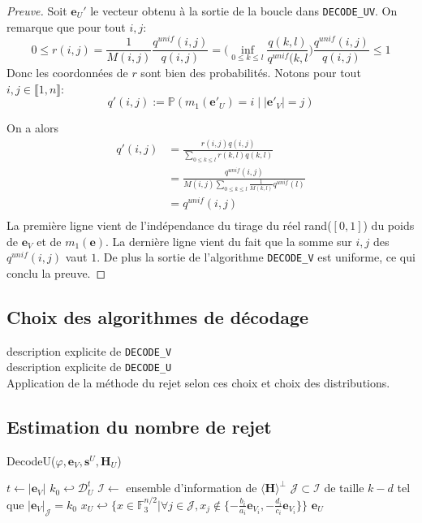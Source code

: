 \documentclass[12pt]{article}
\theoremstyle{plain}
\newcommand{\F}{\mathbb{F}}
\newcommand{\e}{\mathbf{e}}
\newcommand{\s}{\mathbf{s}}
\newcommand{\J}{\mathcal{J}}
\begin{document}
\begin{proof}[Preuve]
Soit $\e_U'$ le vecteur obtenu à la sortie de la boucle dans \verb|DECODE_UV|. On remarque que pour tout $i,j$:
$$0 \leq r(i,j) = \frac{1}{M(i,j)}\frac{q^{unif}(i,j)}{q(i,j)} = \Bigg(\inf_{0 \leq k \leq l}\frac{q(k,l)}{q^{unif}(k,l}\Bigg)\frac{q^{unif}(i,j)}{q(i,j)} \leq 1$$
Donc les coordonnées de $r$ sont bien des probabilités. Notons pour tout $i,j \in \llbracket 1,n \rrbracket$:
$$q'(i,j) := \mathbb{P}(m_1(\mathbf{e'}_U)=i\;|\;|\mathbf{e'}_V|=j)$$

On a alors 
\begin{equation}
\begin{aligned}
q'(i,j) &= \frac{r(i,j)q(i,j)}{\sum_{0 \leq k \leq l}r(k,l)q(k,l)} \\
 &= \frac{q^{unif}(i,j)}{M(i,j)\sum_{0 \leq k \leq l}\frac{1}{M(k,l)}q^{unif}(l)} \\
 &= q^{unif}(i,j) \\
\end{aligned}
\end{equation}
La première ligne vient de l'indépendance du tirage du réel rand($[0,1]$) du poids de $\e_V$ et de $m_1(\e)$. La dernière ligne vient du fait que la somme sur $i,j$ des $q^{unif}(i,j)$ vaut $1$. De plus la sortie de l'algorithme \verb|DECODE_V| est uniforme, ce qui conclu la preuve.
\end{proof}

\subsection{Choix des algorithmes de décodage}
description explicite de \verb|DECODE_V| \\
description explicite de \verb|DECODE_U| \\
Application de la méthode du rejet selon ces choix et choix des distributions. 

\subsection{Estimation du nombre de rejet}


\begin{algorithm}
	\caption{DecodeU($\varphi, \e_V, \s^U, \mathbf{H}_U$)}
	\begin{algorithmic}[1]
		\STATE $t \leftarrow |\e_V|$
		\STATE $k_0 \hookleftarrow \mathcal{D}_U^t$
		\REPEAT
		\STATE $\mathcal{I} \leftarrow$ ensemble d'information de $\langle\mathbf{H}\rangle^\perp$
		\STATE $\mathcal{J} \subset \mathcal{I}$ de taille $k-d$ tel que $|\e_V|_\mathcal{J} = k_0$
		\STATE $x_U \hookleftarrow \{x\in\F_3^{n/2} | \forall j\in\J,  x_j \notin \{-\frac{b_i}{a_i}\e_{V_i}, -\frac{d_i}{c_i}\e_{V_i}\}\}$
		\UNTIL {$|\varphi(\e_U,\e_V)| \neq \omega$}
		\RETURN $\e_U$
    \end{algorithmic}
\end{algorithm}
\end{document}
